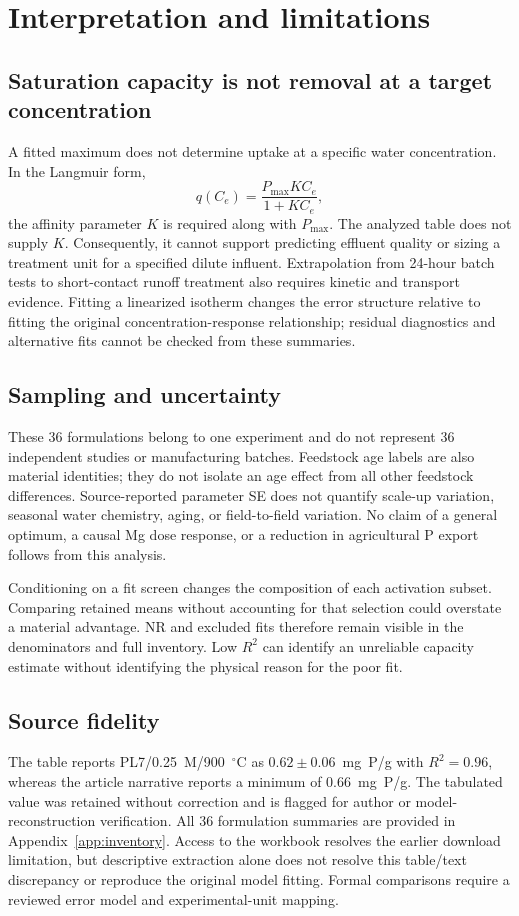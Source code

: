 \documentclass[11pt,letterpaper]{article}
\begin{document}
\section{Interpretation and limitations}
\subsection{Saturation capacity is not removal at a target concentration}
A fitted maximum does not determine uptake at a specific water concentration. In the Langmuir form,
\begin{equation}
q(C_e)=\frac{P_{\max}K C_e}{1+K C_e},
\end{equation}
the affinity parameter $K$ is required along with $P_{\max}$. The analyzed table does not supply $K$. Consequently, it cannot support predicting effluent quality or sizing a treatment unit for a specified dilute influent. Extrapolation from 24-hour batch tests to short-contact runoff treatment also requires kinetic and transport evidence. Fitting a linearized isotherm changes the error structure relative to fitting the original concentration-response relationship; residual diagnostics and alternative fits cannot be checked from these summaries.

\subsection{Sampling and uncertainty}
These 36 formulations belong to one experiment and do not represent 36 independent studies or manufacturing batches. Feedstock age labels are also material identities; they do not isolate an age effect from all other feedstock differences. Source-reported parameter SE does not quantify scale-up variation, seasonal water chemistry, aging, or field-to-field variation. No claim of a general optimum, a causal Mg dose response, or a reduction in agricultural P export follows from this analysis.

Conditioning on a fit screen changes the composition of each activation subset. Comparing retained means without accounting for that selection could overstate a material advantage. NR and excluded fits therefore remain visible in the denominators and full inventory. Low $R^2$ can identify an unreliable capacity estimate without identifying the physical reason for the poor fit.

\subsection{Source fidelity}
The table reports PL7/0.25~M/900~$^\circ$C as $0.62\pm0.06$~mg~P/g with $R^2=0.96$, whereas the article narrative reports a minimum of 0.66~mg~P/g. The tabulated value was retained without correction and is flagged for author or model-reconstruction verification. All 36 formulation summaries are provided in Appendix~\ref{app:inventory}. Access to the workbook resolves the earlier download limitation, but descriptive extraction alone does not resolve this table/text discrepancy or reproduce the original model fitting. Formal comparisons require a reviewed error model and experimental-unit mapping.
\end{document}
